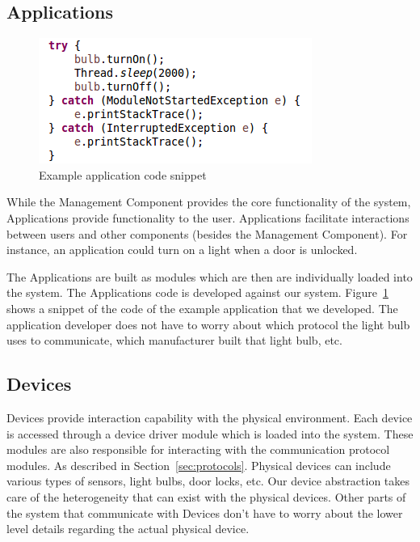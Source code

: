 \subsection{Applications}
\label{sec:apps}
\begin{figure}[tbh]                                                              
    \centering                                                                   
    \includegraphics[width=1.0\columnwidth]{figs/appcode.png}                       
    \caption{Example application code snippet}                                  
    \label{Fig:appcode}                                                             
\end{figure} 
While the Management Component provides the core functionality of the system,
Applications provide functionality to the user. Applications facilitate
interactions between users and other components (besides the Management
Component). For instance, an application could turn on a light when a door is
unlocked.

The Applications are built as modules which are then are individually loaded
into the system. The Applications code is developed against our system.
Figure~\ref{Fig:appcode} shows a snippet of the code of the example application
that we developed. The application developer does not have to worry about which
protocol the light bulb uses to communicate, which manufacturer built that light
bulb, etc.
\subsection{Devices}
\label{sec:devices}
Devices provide interaction capability with the physical environment. Each
device is accessed through a device driver module which is loaded into the
system. These modules are also responsible for interacting with the
communication protocol modules. As described in Section~\ref{sec:protocols}.
Physical devices can include various types of sensors, light bulbs, door locks,
etc. Our device abstraction takes care of the heterogeneity that can exist with
the physical devices. Other parts of the system that communicate with Devices
don't have to worry about the lower level details regarding the actual physical
device.
